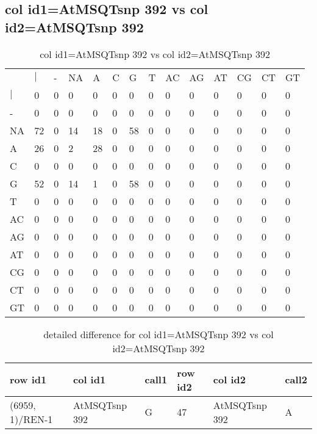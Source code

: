 \subsection{col id1=AtMSQTsnp 392 vs col id2=AtMSQTsnp 392}
\begin{center}
\begin{longtable}{|l|l|l|l|l|l|l|l|l|l|l|l|l|l|}
\caption{col id1=AtMSQTsnp 392 vs col id2=AtMSQTsnp 392} \label{table_dm904}\\
\hline
\\
\hline
&$|$&-&NA&A&C&G&T&AC&AG&AT&CG&CT&GT\\
$|$&0&0&0&0&0&0&0&0&0&0&0&0&0\\
-&0&0&0&0&0&0&0&0&0&0&0&0&0\\
NA&72&0&14&18&0&58&0&0&0&0&0&0&0\\
A&26&0&2&28&0&0&0&0&0&0&0&0&0\\
C&0&0&0&0&0&0&0&0&0&0&0&0&0\\
G&52&0&14&1&0&58&0&0&0&0&0&0&0\\
T&0&0&0&0&0&0&0&0&0&0&0&0&0\\
AC&0&0&0&0&0&0&0&0&0&0&0&0&0\\
AG&0&0&0&0&0&0&0&0&0&0&0&0&0\\
AT&0&0&0&0&0&0&0&0&0&0&0&0&0\\
CG&0&0&0&0&0&0&0&0&0&0&0&0&0\\
CT&0&0&0&0&0&0&0&0&0&0&0&0&0\\
GT&0&0&0&0&0&0&0&0&0&0&0&0&0\\
\hline
\end{longtable}
\end{center}

\begin{center}
\begin{longtable}{|l|l|l|l|l|l|}
\caption{detailed difference for col id1=AtMSQTsnp 392 vs col id2=AtMSQTsnp 392} \label{table_dm905}\\
\hline
row id1&col id1&call1&row id2&col id2&call2\\
\hline
(6959, 1)/REN-1&AtMSQTsnp 392&G&47&AtMSQTsnp 392&A\\
\hline
\end{longtable}
\end{center}

